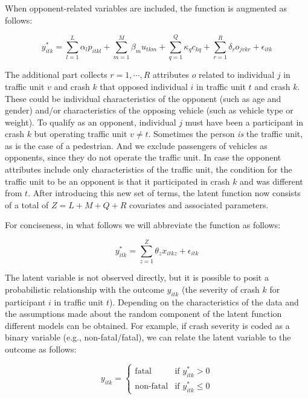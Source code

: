 \documentclass[]{elsarticle} %
\begin{document}
When opponent-related variables are included, the function is augmented
as follows:

\begin{equation}
\label{eq:latent-function-with-opponent-variables}
y_{itk}^*=\sum_{l=1}^L\alpha_lp_{itkl} + \sum_{m=1}^M\beta_mu_{tkm} + \sum_{q=1}^Q\kappa_qc_{kq} + \sum_{r=1}^R\delta_ro_{jvkr} + \epsilon_{itk}
\end{equation}

The additional part collects \(r=1,\cdots,R\) attributes \(o\) related
to individual \(j\) in traffic unit \(v\) and crash \(k\) that opposed
individual \(i\) in traffic unit \(t\) and crash \(k\). These could be
individual characteristics of the opponent (such as age and gender)
and/or characteristics of the opposing vehicle (such as vehicle type or
weight). To qualify as an opponent, individual \(j\) must have been a
participant in crash \(k\) but operating traffic unit \(v\ne t\).
Sometimes the person \emph{is} the traffic unit, as is the case of a
pedestrian. And we exclude passengers of vehicles as opponents, since
they do not operate the traffic unit. In case the opponent attributes
include only characteristics of the traffic unit, the condition for the
traffic unit to be an opponent is that it participated in crash \(k\)
and was different from \(t\). After introducing this new set of terms,
the latent function now consists of a total of \(Z=L+M+Q+R\) covariates
and associated parameters.

For conciseness, in what follows we will abbreviate the function as
follows:

\begin{equation}
\label{eq:latent-function-compact}
y_{itk}^*=\sum_{z=1}^Z\theta_zx_{itkz} + \epsilon_{itk}
\end{equation}

The latent variable is not observed directly, but it is possible to
posit a probabilistic relationship with the outcome \(y_{itk}\) (the
severity of crash \(k\) for participant \(i\) in traffic unit \(t\)).
Depending on the characteristics of the data and the assumptions made
about the random component of the latent function different models can
be obtained. For example, if crash severity is coded as a binary
variable (e.g., non-fatal/fatal), we can relate the latent variable to
the outcome as follows:

\begin{equation}
\label{eq:latent-function-2-outcomes}
y_{itk} = 
\begin{cases}
\text{fatal} & \text{if } y_{itk}^*>0\\
\text{non-fatal} & \text{if } y_{itk}^*\leq0
\end{cases}
\end{equation}
\end{document}
